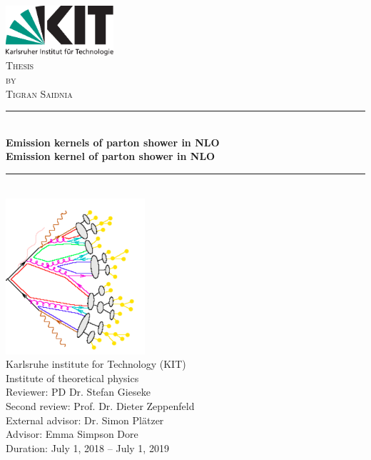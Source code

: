 \begin{titlepage}

\begin{center}


\includegraphics[width=0.3\textwidth]{images/Intro/kitlogo_de_rgb}\\[1cm]    

\textsc{\LARGE Thesis}\\[0.5cm]
\textsc{\Large by}\\[0.5cm]
\textsc{\Large Tigran Saidnia}\\[1.0cm]


\newcommand{\HRule}{\rule{\linewidth}{0.5mm}}
\HRule \\[0.8mm]
{\textbf{\Large \bfseries Emission kernels of parton shower in NLO}}\\[0.8mm]

{\textbf{\bfseries Emission kernel of parton shower in NLO}}\\[0.8mm]

\HRule \\[1cm]
\includegraphics[scale=0.7]{images/Intro/footPicture.PNG}\\[0.8cm]   

\Large Karlsruhe institute for Technology (KIT)\\[1.5mm]
\Large Institute of theoretical physics\\[1.0cm]

{\Large Reviewer: PD Dr. Stefan Gieseke \\
\Large Second review: Prof. Dr. Dieter Zeppenfeld\\
\Large External advisor: Dr. Simon Plätzer\\
\Large Advisor: Emma Simpson Dore}\\[0.8cm]   

Duration: July 1, 2018  –  July 1, 2019

\vfill


\end{center}

\end{titlepage}